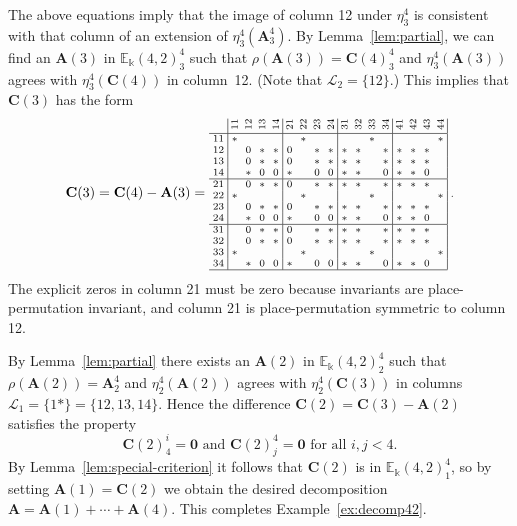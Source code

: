 \documentclass[ALCO,ThmDefs,Unicode,epreuves]{cedram}
\newcommand{\E}{\mathbb{E}}
\newcommand{\Lin}{{\mathscr{L}}}
\newcommand{\bA}{\mathbf{A}}
\newcommand{\bC}{\mathbf{C}}
\newcommand{\bzero}{\mathbf{0}}
\newcommand{\rt}[1]{\rotatebox{90}{#1}}
\begin{document}
\begin{exam}
The above equations imply that the image of column 12 under $\eta^4_3$
is consistent with that column of an extension of
$\eta^4_3(\bA^4_3)$. By Lemma~\ref{lem:partial}, we can find an
$\bA(3)$ in $\E_\Bbbk(4,2)^4_3$ such that $\rho(\bA(3)) = \bC(4)^4_3$
and $\eta^4_3 (\bA(3))$ agrees with $\eta^4_3(\bC(4))$ in column~12. 
(Note that $\Lin_2=\{12\}$.) This implies that $\bC(3)$ has the form
\[
\bC(3) = \bC(4) - \bA(3) = 
\text{\setlength{\arraycolsep}{2.7pt}\scriptsize
$\displaystyle 
\begin{array}{c|cccc|cccc|cccc|cccc|}
 &\rt{11}&\rt{12}&\rt{13}&\rt{14}&\rt{21}&\rt{22}&\rt{23}&\rt{24}&
 \rt{31}&\rt{32}&\rt{33}&\rt{34}&\rt{41}&\rt{42}&\rt{43}&\rt{44}\\ \hline
 11&*& & & & &*& & & & &*& & & & &*\\
 12& &0&*&*&0& &*&*&*&*& &*&*&*&* & \\
 13& &0&*&*&0& &*&*&*&*& &*&*&*&*& \\
 14& &*&0&0&*& &0&0&*&*& &0&*&*&0& \\ \hline
 21& &0&*&*&0& &*&*&*&*& &*&*&*&*& \\ 
 22&*& & & & &*& & & & &*& & & & &*\\
 23& &0&*&*&0& &*&*&*&*& &*&*&*&*& \\ 
 24& &*&0&0&*& &0&0&*&*& &0&*&*&0& \\ \hline 
 31& &0&*&*&0& &*&*&*&*& &*&*&*&*& \\
 32& &0&*&*&0& &*&*&*&*& &*&*&*&*& \\
 33&*& & & & &*& & & & &*& & & & &*\\ 
 34& &*&0&0&*& &0&0&*&*& &0&*&*&0& \\ \hline
 \end{array} \; .$}
\]
The explicit zeros in column 21 must be zero because invariants are
place-permutation invariant, and column 21 is place-permutation
symmetric to column 12.

By Lemma~\ref{lem:partial} there exists an $\bA(2)$ in
$\E_\Bbbk(4,2)^4_2$ such that $\rho(\bA(2)) = \bA^4_2$ and $\eta^4_2
(\bA(2))$ agrees with $\eta^4_2(\bC(3))$ in columns $\Lin_1 = \{1*\} =
\{12, 13, 14\}$. Hence the difference $\bC(2) = \bC(3) - \bA(2)$
satisfies the property
\[
\text{$\bC(2)^i_4 = \bzero$ and $\bC(2)^4_j = \bzero$ for all $i, j
 <4$.}
\]
By Lemma~\ref{lem:special-criterion} it follows that $\bC(2)$ is
in $\E_\Bbbk(4,2)^4_1$, so by setting $\bA(1) = \bC(2)$ we obtain the
desired decomposition $\bA = \bA(1)+ \cdots + \bA(4)$. This completes
Example~\ref{ex:decomp42}.
\end{exam}
\end{document}
